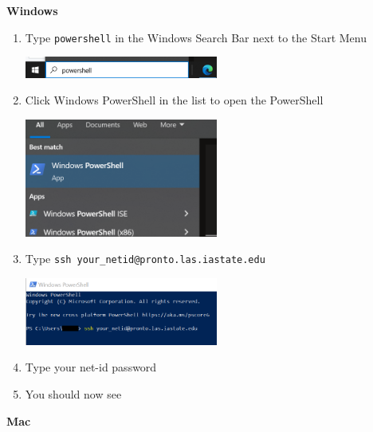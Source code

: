 \documentclass[
]{book}
\newenvironment{Shaded}{\begin{snugshade}}{\end{snugshade}}
\newcommand{\ExtensionTok}[1]{#1}
\newcommand{\NormalTok}[1]{#1}
\begin{document}
\textbf{Windows}

\begin{enumerate}
\def\labelenumi{\arabic{enumi}.}
\item
  Type \texttt{powershell} in the Windows Search Bar next to the Start Menu

  \includegraphics[width=0.5\textwidth,height=0.5\textheight]{images/windows_search_bar.png}
\item
  Click Windows PowerShell in the list to open the PowerShell

  \includegraphics[width=0.5\textwidth,height=0.5\textheight]{images/powershell.png}
\item
  Type \texttt{ssh\ your\_netid@pronto.las.iastate.edu}

  \includegraphics[width=0.5\textwidth,height=0.5\textheight]{images/ssh_to_pronto.png}
\item
  Type your net-id password
\item
  You should now see

\begin{Shaded}
\end{Shaded}
\end{enumerate}

\textbf{Mac}
\end{document}
